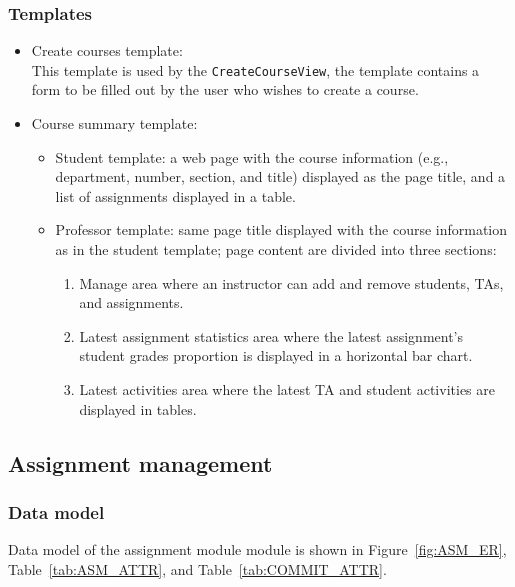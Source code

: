 \subsubsection{Templates}
\begin{itemize}
    \item Create courses template: \\
        This template is used by the \texttt{CreateCourseView}, the template
        contains a form to be filled out by the user who
        wishes to create a course. 
    \item Course summary template:
    \begin{itemize}
        \item Student template: a web page with the course information
            (e.g., department, number, section, and title)
            displayed as the page title, and a list of assignments displayed
            in a table.
        \item Professor template: same page title displayed with the course
            information as in the student template;
            page content are divided into three sections:
            \begin{enumerate}
                \item Manage area where an instructor can add and remove
                    students, TAs, and assignments.
                \item Latest assignment statistics area where the latest
                    assignment's student grades proportion is displayed
                    in a horizontal bar chart.
                \item Latest activities area where the latest TA and student
                    activities are displayed in tables.
            \end{enumerate}
    \end{itemize}
\end{itemize}





\subsection{Assignment management}
\label{sec:ASM_MAN}

\subsubsection{Data model}
Data model of the assignment module module is shown in
Figure~\ref{fig:ASM_ER}, Table~\ref{tab:ASM_ATTR},
and Table~\ref{tab:COMMIT_ATTR}. \bigskip

